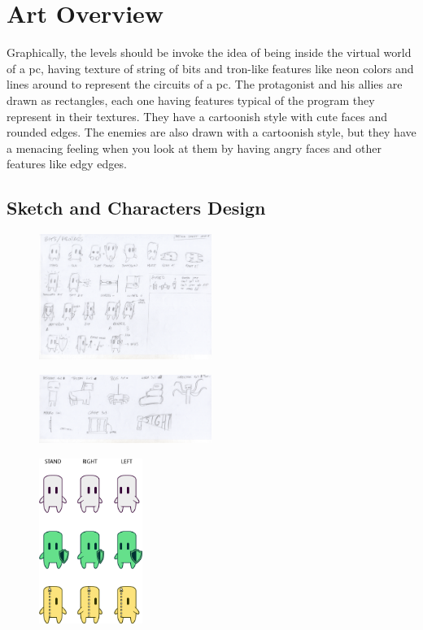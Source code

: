 \documentclass[12pt, a4paper]{report}
\begin{document}
\chapter{Art Overview}
Graphically, the levels should be invoke the idea of being inside the virtual world of a pc, having texture of string of bits and tron-like features like neon colors and lines around to represent the circuits of a pc.
The protagonist and his allies are drawn as rectangles, each one having features typical of the program they represent in their textures. They have a cartoonish style with cute faces and rounded edges. The enemies are also drawn with a cartoonish style, but they have a menacing feeling when you look at them by having angry faces and other features like edgy edges.\\
\section*{Sketch and Characters Design}
\begin{figure}[H]
	\centering
	\includegraphics[width=0.5\textwidth]{images/Characters}
\end{figure}
	\begin{figure}[H]
	\centering
	\includegraphics[width=0.5\textwidth]{images/Enemy}
\end{figure}
	\begin{figure}[H]
	\centering
	\includegraphics[width=0.3\textwidth]{images/Bits}
\end{figure}
\end{document}
